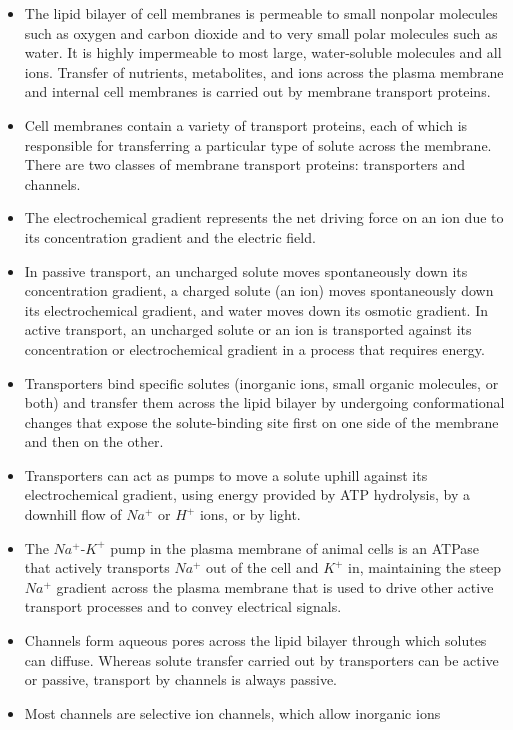\begin{itemize}
\item The lipid bilayer of cell membranes is permeable to small nonpolar
molecules such as oxygen and carbon dioxide and to very small
polar molecules such as water. It is highly impermeable to most
large, water-soluble molecules and all ions. Transfer of nutrients,
metabolites, and ions across the plasma membrane and internal cell
membranes is carried out by membrane transport proteins.
\item Cell membranes contain a variety of transport proteins, each of which
is responsible for transferring a particular type of solute across the
membrane. There are two classes of membrane transport proteins:
transporters and channels.
\item The electrochemical gradient represents the net driving force on an
ion due to its concentration gradient and the electric field.
\item In passive transport, an uncharged solute moves spontaneously
down its concentration gradient, a charged solute (an ion) moves
spontaneously down its electrochemical gradient, and water moves
down its osmotic gradient. In active transport, an uncharged solute
or an ion is transported against its concentration or electrochemical
gradient in a process that requires energy.
\item Transporters bind specific solutes (inorganic ions, small organic
molecules, or both) and transfer them across the lipid bilayer by
undergoing conformational changes that expose the solute-binding
site first on one side of the membrane and then on the other.
\item Transporters can act as pumps to move a solute uphill against its
electrochemical gradient, using energy provided by ATP hydrolysis,
by a downhill flow of $Na^{+}$ or $H^{+}$ ions, or by light.
\item The $Na^{+}$-$K^{+}$ pump in the plasma membrane of animal cells is an ATPase
that actively transports $Na^{+}$ out of the cell and $K^{+}$ in, maintaining the
steep $Na^{+}$ gradient across the plasma membrane that is used to drive
other active transport processes and to convey electrical signals.
\item Channels form aqueous pores across the lipid bilayer through which
solutes can diffuse. Whereas solute transfer carried out by transporters
can be active or passive, transport by channels is always
passive.
\item Most channels are selective ion channels, which allow inorganic ions

\end{itemize}
